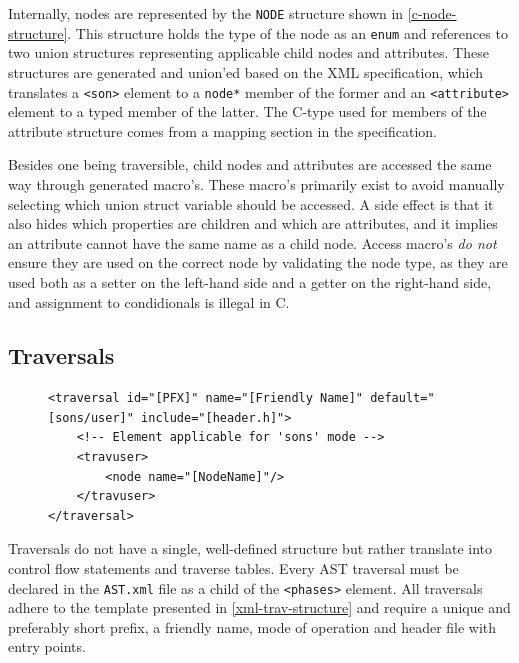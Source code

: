 \documentclass[twoside,openright]{uva-bachelor-thesis}
\newcommand{\includexml}[3]{\begin{figure}\end{figure}}
\newcommand{\code}[1]{\texttt{\footnotesize#1}}
\begin{document}
			Internally, nodes are represented by the \code{NODE} structure shown in \cref{c-node-structure}. This structure holds the type of the node as an \code{enum} and references to two union structures representing applicable child nodes and attributes. These structures are generated and union'ed based on the XML specification, which translates a \code{<son>} element to a \code{node*} member of the former and an \code{<attribute>} element to a typed member of the latter. The C-type used for members of the attribute structure comes from a mapping section in the specification.
			
			Besides one being traversible, child nodes and attributes are accessed the same way through generated macro's. These macro's primarily exist to avoid manually selecting which union struct variable should be accessed. A side effect is that it also hides which properties are children and which are attributes, and it implies an attribute cannot have the same name as a child node. Access macro's \emph{do not} ensure they are used on the correct node by validating the node type, as they are used both as a setter on the left-hand side and a getter on the right-hand side, and assignment to condidionals is illegal in C.

		\subsection{Traversals}
			\includexml{trav_structure.xml}{xml-trav-structure}{Template for specification of a traversal}
			
			\begin{figure}
				\begin{lstlisting}[style=xmlstyle,caption=test,label=test2123]
<traversal id="[PFX]" name="[Friendly Name]" default="[sons/user]" include="[header.h]">
	<!-- Element applicable for 'sons' mode -->
	<travuser>
		<node name="[NodeName]"/>
	</travuser>
</traversal>
				\end{lstlisting}
			\end{figure}
			
			Traversals do not have a single, well-defined structure but rather translate into control flow statements and traverse tables. Every AST traversal must be declared in the \code{AST.xml} file as a child of the \code{<phases>} element. All traversals adhere to the template presented in \cref{xml-trav-structure} and require a unique and preferably short prefix, a friendly name, mode of operation and header file with entry points.
			
\end{document}
